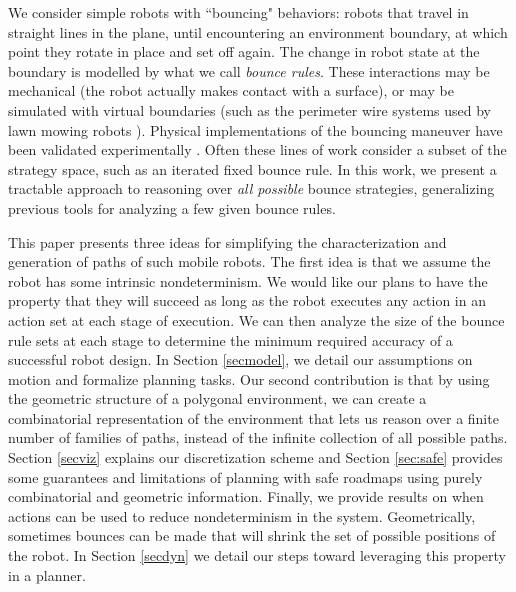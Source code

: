 \documentclass[]{article}
\begin{document}
We consider simple robots with ``bouncing" behaviors: robots that
travel in straight lines in the plane, until encountering an environment
boundary, at which point they rotate in place and set off again. The change in
robot state at the boundary is modelled by what we call {\em bounce rules}.
These interactions may be mechanical (the robot actually makes contact with a
surface), or may be simulated with
virtual boundaries (such as the perimeter wire systems used by lawn mowing robots
\cite{sahin2007household}). Physical implementations of the bouncing maneuver have
been validated experimentally \cite{alam2018space,LewOKa13}.
Often these lines of work consider a subset of the strategy space, such as an iterated fixed bounce rule. In this work, 
we present a tractable approach to reasoning over {\em all possible} bounce strategies,
generalizing previous tools for analyzing a few given bounce rules.

This paper presents three ideas for simplifying the characterization and
generation of paths of such mobile robots. The first idea is that we assume 
the robot has some intrinsic
nondeterminism. We would like our plans to have the property that they will
succeed as long as the
robot executes any action in an action set at each stage of execution.
We can then analyze the size of the bounce rule sets at each stage to
determine the minimum required accuracy of a successful robot design. In Section
\ref{secmodel}, we detail our assumptions on motion and formalize planning tasks.
Our second contribution is that by using the geometric
structure of a polygonal environment, we can create a combinatorial
representation of the environment that lets us reason over a finite number of
families of paths, instead of the infinite collection of all possible paths.
Section \ref{secviz} explains our discretization scheme and Section
\ref{sec:safe} provides some guarantees and limitations of planning with safe roadmaps 
using purely combinatorial and geometric information.
Finally, we provide results on when actions can be used to reduce
nondeterminism in the system. Geometrically, sometimes bounces can be made
that will shrink the set of possible positions of the robot.
In Section \ref{secdyn} we detail our steps toward leveraging this property in a planner.
\end{document}
